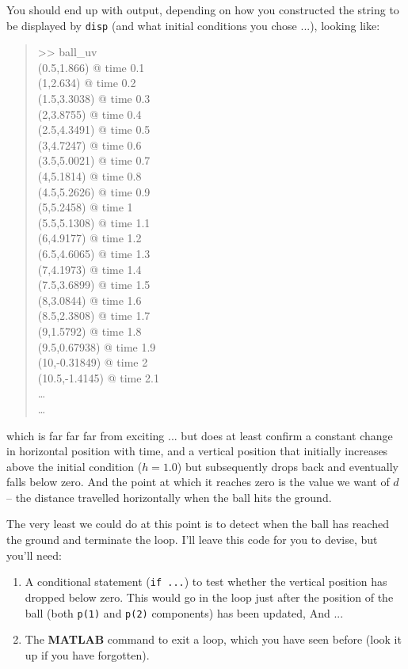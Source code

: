\documentclass{tufte-book} %
\newenvironment{docspecmargin}{\begin{quotation}\ttfamily\footnotesize\parskip0pt\parindent0pt\ignorespaces}{\end{quotation}}
\begin{document}
You should end up with output, depending on how you constructed the string to be displayed by \texttt{disp} (and what initial conditions you chose ...), looking like:

\begin{docspecmargin}
>> ball\_uv
\\(0.5,1.866) @ time 0.1
\\(1,2.634) @ time 0.2
\\(1.5,3.3038) @ time 0.3
\\(2,3.8755) @ time 0.4
\\(2.5,4.3491) @ time 0.5
\\(3,4.7247) @ time 0.6
\\(3.5,5.0021) @ time 0.7
\\(4,5.1814) @ time 0.8
\\(4.5,5.2626) @ time 0.9
\\(5,5.2458) @ time 1
\\(5.5,5.1308) @ time 1.1
\\(6,4.9177) @ time 1.2
\\(6.5,4.6065) @ time 1.3
\\(7,4.1973) @ time 1.4
\\(7.5,3.6899) @ time 1.5
\\(8,3.0844) @ time 1.6
\\(8.5,2.3808) @ time 1.7
\\(9,1.5792) @ time 1.8
\\(9.5,0.67938) @ time 1.9
\\(10,-0.31849) @ time 2
\\(10.5,-1.4145) @ time 2.1
\\ \ldots 
\\ \ldots 
\end{docspecmargin}
which is far far far from exciting ... but does at least confirm a constant change in horizontal position with time, and a vertical position that initially increases above the initial condition (\(h=1.0\)) but subsequently drops back and eventually falls below zero. And the point at which it reaches zero is the value we want of \(d\) -- the distance travelled horizontally when the ball hits the ground.

The very least we could do at this point is to detect when the ball has reached the ground and terminate the loop. I'll leave this code for you to devise, but you'll need:
\begin{enumerate}[noitemsep]
\setlength{\itemindent}{.2in}
\item A conditional statement (\texttt{if ...}) to test whether the vertical position has dropped below zero. This would go in the loop just after the position of the ball (both \texttt{p(1)} and \texttt{p(2)} components) has been updated, And ...
\item The \textbf{MATLAB} command to exit a loop, which you have seen before (look it up if you have forgotten).
\end{enumerate}
\end{document}
